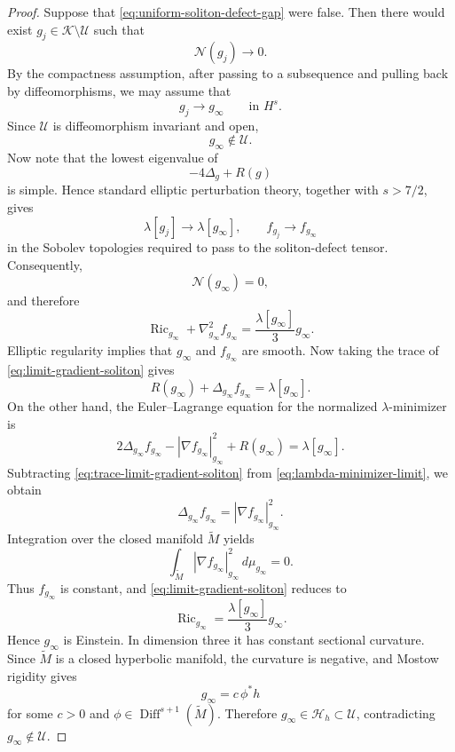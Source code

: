 \documentclass{amsart}
\begin{document}
\begin{proof}
Suppose that \eqref{eq:uniform-soliton-defect-gap} were false.
Then there would exist \(g_j\in\mathscr K\setminus\mathcal U\)
such that
\[
        \mathcal N(g_j)\longrightarrow0.
\]
By the compactness assumption, after passing to a subsequence and
pulling back by diffeomorphisms, we may assume that
\[
        g_j\longrightarrow g_\infty
        \qquad\text{in }H^s.
\]
Since \(\mathcal U\) is diffeomorphism invariant and open,
\[
        g_\infty\notin\mathcal U.
\]
Now note that the lowest eigenvalue of
\[
        -4\Delta_g+R(g)
\]
is simple. Hence standard elliptic perturbation theory, together
with \(s>7/2\), gives
\[
        \lambda[g_j]\longrightarrow\lambda[g_\infty],
        \qquad
        f_{g_j}\longrightarrow f_{g_\infty}
\]
in the Sobolev topologies required to pass to the soliton-defect
tensor. Consequently,
\[
        \mathcal N(g_\infty)=0,
\]
and therefore
\begin{equation}
\label{eq:limit-gradient-soliton}
        \operatorname{Ric}_{g_\infty}
        +
        \nabla_{g_\infty}^2f_{g_\infty}
        =
        \frac{\lambda[g_\infty]}{3}g_\infty.
\end{equation}
Elliptic regularity implies that \(g_\infty\) and \(f_{g_\infty}\)
are smooth. Now taking the trace of
\eqref{eq:limit-gradient-soliton} gives
\begin{equation}
\label{eq:trace-limit-gradient-soliton}
        R(g_\infty)
        +
        \Delta_{g_\infty}f_{g_\infty}
        =
        \lambda[g_\infty].
\end{equation}
On the other hand, the Euler--Lagrange equation for the normalized
\(\lambda\)-minimizer is
\begin{equation}
\label{eq:lambda-minimizer-limit}
        2\Delta_{g_\infty}f_{g_\infty}
        -
        |\nabla f_{g_\infty}|_{g_\infty}^2
        +
        R(g_\infty)
        =
        \lambda[g_\infty].
\end{equation}
Subtracting \eqref{eq:trace-limit-gradient-soliton} from
\eqref{eq:lambda-minimizer-limit}, we obtain
\[
        \Delta_{g_\infty}f_{g_\infty}
        =
        |\nabla f_{g_\infty}|_{g_\infty}^2.
\]
Integration over the closed manifold \(\widetilde M\) yields
\[
        \int_{\widetilde M}
        |\nabla f_{g_\infty}|_{g_\infty}^2
        \,d\mu_{g_\infty}
        =0.
\]
Thus \(f_{g_\infty}\) is constant, and
\eqref{eq:limit-gradient-soliton} reduces to
\[
        \operatorname{Ric}_{g_\infty}
        =
        \frac{\lambda[g_\infty]}{3}g_\infty.
\]
Hence \(g_\infty\) is Einstein. In dimension three it has constant
sectional curvature. Since \(\widetilde M\) is a closed hyperbolic
manifold, the curvature is negative, and Mostow rigidity gives
\[
        g_\infty=c\,\phi^*h
\]
for some \(c>0\) and
\(\phi\in\operatorname{Diff}^{s+1}(\widetilde M)\). Therefore
\(g_\infty\in\mathscr H_h\subset\mathcal U\), contradicting
\(g_\infty\notin\mathcal U\).
\end{proof}
\end{document}
